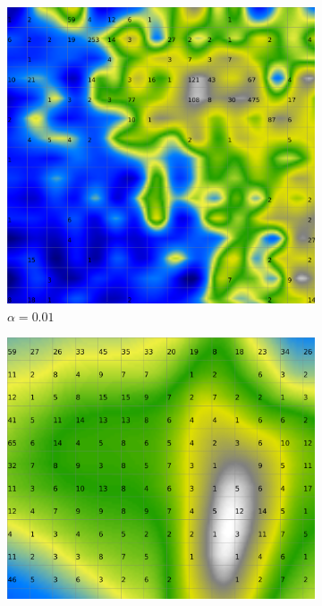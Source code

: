 \documentclass{acm_proc_article-sp}
\begin{document}
\begin{figure}
\centering
    \centering
    \begin{subfigure}[b]{0.24\linewidth}
        \includegraphics[width=\linewidth]{img/wine-20x16-smoothed-data-histogram-alpha-0.01-f-149}
        \caption{$\alpha=0.01$}
        \label{fig:wine-20x16-smoothed-data-histogram-alpha-0.01-f-149}
    \end{subfigure}
    \begin{subfigure}[b]{0.24\linewidth}
        \includegraphics[width=\linewidth]{img/wine-20x16-smoothed-data-histogram-alpha-0.45-f-149}

\end{subfigure}
\end{figure}
\end{document}
